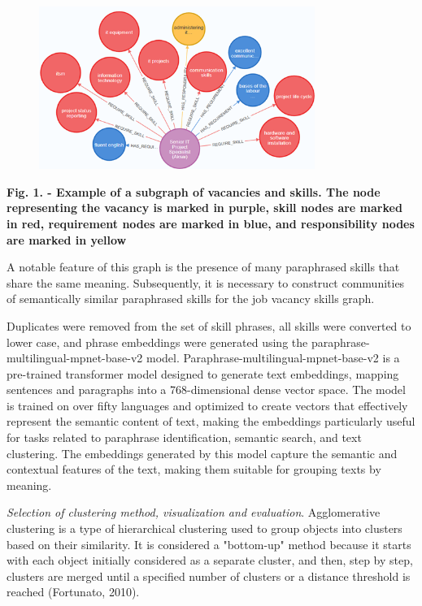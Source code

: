 \begin{figure}[H]
	\centering
	\includegraphics[width=0.8\textwidth]{media/ict/image104}
	\caption*{}
\end{figure}


{\bfseries Fig. 1. - Example of a subgraph of vacancies and skills. The
node representing the vacancy is marked in purple, skill nodes are
marked in red, requirement nodes are marked in blue, and responsibility
nodes are marked in yellow}

A notable feature of this graph is the presence of many paraphrased
skills that share the same meaning. Subsequently, it is necessary to
construct communities of semantically similar paraphrased skills for the
job vacancy skills graph.

Duplicates were removed from the set of skill phrases, all skills were
converted to lower case, and phrase embeddings were generated using the
paraphrase-multilingual-mpnet-base-v2 model.
Paraphrase-multilingual-mpnet-base-v2 is a pre-trained transformer model
designed to generate text embeddings, mapping sentences and paragraphs
into a 768-dimensional dense vector space. The model is trained on over
fifty languages and optimized to create vectors that effectively
represent the semantic content of text, making the embeddings
particularly useful for tasks related to paraphrase identification,
semantic search, and text clustering. The embeddings generated by this
model capture the semantic and contextual features of the text, making
them suitable for grouping texts by meaning.

\emph{Selection of clustering method, visualization and evaluation}.
Agglomerative clustering is a type of hierarchical clustering used to
group objects into clusters based on their similarity. It is considered
a "bottom-up" method because it starts with each object initially
considered as a separate cluster, and then, step by step, clusters are
merged until a specified number of clusters or a distance threshold is
reached (Fortunato, 2010).

